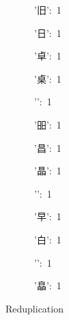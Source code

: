 \begin{multicols}{2}
{\null\par
      '{\cjk{}旧}': 1\par
      '{\cjk{}日}': 1\par
      '{\cjk{}卓}': 1\par
      '{\cjk{}桌}': 1\par
      '{}': 1\par
      '{\cjk{}昍}': 1\par
      '{\cjk{}昌}': 1\par
      '{\cjk{}晶}': 1\par
      '{}': 1\par
      '{\cjk{}早}': 1\par
      '{\cjk{}白}': 1\par
      '{}': 1\par
      '{\cjk{}皛}': 1\par
\null\par
Reduplication\par
\null\par
}

\end{multicols}

\mktsRuleSwell{}

